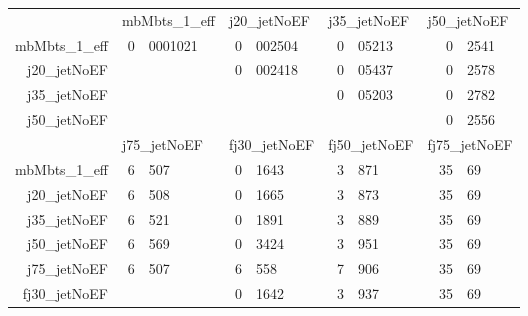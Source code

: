 \begin{table}
\begin{center}
  \begin{tabular}{ r r@{.}l r@{.}l r@{.}l r@{.}l }
                   & \multicolumn{2}{l}{mbMbts\_1\_eff} & \multicolumn{2}{l}{j20\_jetNoEF}  & \multicolumn{2}{l}{j35\_jetNoEF}  & \multicolumn{2}{l}{j50\_jetNoEF}  \\
    \cmidrule{2-9}
    mbMbts\_1\_eff & 0&0001021                          & 0&002504                          & 0&05213                           & 0&2541                            \\
    j20\_jetNoEF   & \multicolumn{2}{l}{}               & 0&002418                          & 0&05437                           & 0&2578                            \\
    j35\_jetNoEF   & \multicolumn{2}{l}{}               & \multicolumn{2}{l}{}              & 0&05203                           & 0&2782                            \\
    j50\_jetNoEF   & \multicolumn{2}{l}{}               & \multicolumn{2}{l}{}              & \multicolumn{2}{l}{}              & 0&2556                            \\
                   & \multicolumn{2}{l}{j75\_jetNoEF}   & \multicolumn{2}{l}{fj30\_jetNoEF} & \multicolumn{2}{l}{fj50\_jetNoEF} & \multicolumn{2}{l}{fj75\_jetNoEF} \\
    \cmidrule{2-9}
    mbMbts\_1\_eff & 6&507                              & 0&1643                            & 3&871                             & 35&69                             \\
    j20\_jetNoEF   & 6&508                              & 0&1665                            & 3&873                             & 35&69                             \\
    j35\_jetNoEF   & 6&521                              & 0&1891                            & 3&889                             & 35&69                             \\
    j50\_jetNoEF   & 6&569                              & 0&3424                            & 3&951                             & 35&69                             \\
    j75\_jetNoEF   & 6&507                              & 6&558                             & 7&906                             & 35&69                             \\
    fj30\_jetNoEF  & \multicolumn{2}{l}{}               & 0&1642                            & 3&937                             & 35&69                             \\

\end{tabular}
\end{center}
\end{table}
